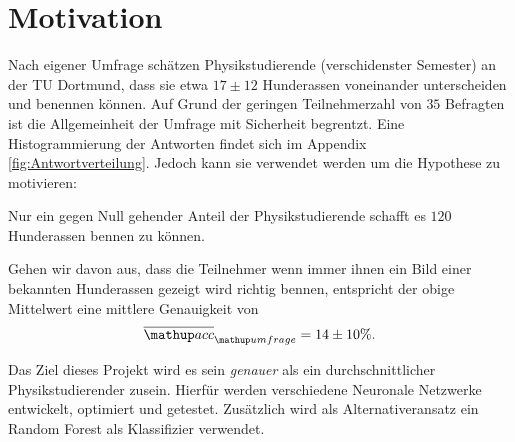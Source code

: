 \setcounter{page}{1}
\section*{Motivation}
Nach eigener Umfrage schätzen Physikstudierende (verschidenster Semester)
an der TU Dortmund, dass sie etwa $17 \pm 12$ Hunderassen voneinander
unterscheiden und benennen können.
Auf Grund der geringen Teilnehmerzahl von $35$ Befragten
ist die Allgemeinheit der Umfrage mit Sicherheit begrentzt. Eine Histogrammierung
der Antworten findet sich im Appendix \ref{fig:Antwortverteilung}.
Jedoch kann sie verwendet werden um die Hypothese zu motivieren:
\begin{center}
  Nur ein gegen Null gehender Anteil der Physikstudierende schafft es $120$
  Hunderassen bennen zu können.
\end{center}
Gehen wir davon aus, dass die Teilnehmer wenn immer ihnen ein Bild einer bekannten
Hunderassen gezeigt wird richtig bennen, entspricht der obige Mittelwert eine
mittlere Genauigkeit von
\begin{equation}
  \label{eq:umfrage_mittlere_genauigkeit}
  \ov{\map{acc}}\ua{umfrage} = 14 \pm 10 \%.
\end{equation}

Das Ziel dieses Projekt wird es sein \emph{genauer} als ein durchschnittlicher
Physikstudierender zusein.
Hierfür werden verschiedene Neuronale Netzwerke entwickelt, optimiert und getestet.
Zusätzlich wird als Alternativeransatz ein Random Forest als Klassifizier verwendet.
